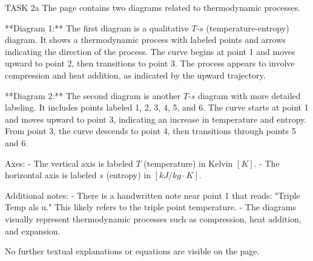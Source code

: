 TASK 2a  
The page contains two diagrams related to thermodynamic processes.  

**Diagram 1:**  
The first diagram is a qualitative \( T \)-\( s \) (temperature-entropy) diagram. It shows a thermodynamic process with labeled points and arrows indicating the direction of the process. The curve begins at point 1 and moves upward to point 2, then transitions to point 3. The process appears to involve compression and heat addition, as indicated by the upward trajectory.  

**Diagram 2:**  
The second diagram is another \( T \)-\( s \) diagram with more detailed labeling. It includes points labeled 1, 2, 3, 4, 5, and 6. The curve starts at point 1 and moves upward to point 3, indicating an increase in temperature and entropy. From point 3, the curve descends to point 4, then transitions through points 5 and 6.  

Axes:  
- The vertical axis is labeled \( T \) (temperature) in Kelvin \([K]\).  
- The horizontal axis is labeled \( s \) (entropy) in \([kJ/kg·K]\).  

Additional notes:  
- There is a handwritten note near point 1 that reads: "Triple Temp als u." This likely refers to the triple point temperature.  
- The diagrams visually represent thermodynamic processes such as compression, heat addition, and expansion.  

No further textual explanations or equations are visible on the page.
